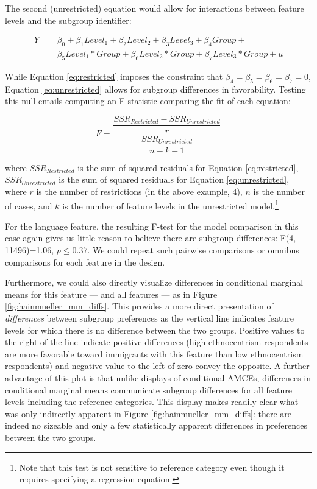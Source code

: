 \documentclass[a4paper,12pt]{article}\usepackage[]{graphicx}\usepackage[]{color}
\begin{document}
\noindent The second (unrestricted) equation would allow for interactions between feature levels and the subgroup identifier:

\begin{equation}\label{eq:unrestricted}
\begin{split}
Y = & \beta_0 + \beta_1 Level_1 + \beta_2 Level_2 + \beta_3 Level_3 + \beta_4 Group + \\
& \beta_5 Level_1 * Group + \beta_6 Level_2 * Group + \beta_7 Level_3 * Group + u
\end{split}
\end{equation}

\noindent While Equation \ref{eq:restricted} imposes the constraint that $\beta_4 = \beta_5 = \beta_6 = \beta_7 = 0$, Equation \ref{eq:unrestricted} allows for subgroup differences in favorability. Testing this null entails computing an F-statistic comparing the fit of each equation:

\begin{equation}
F = \dfrac{\dfrac{SSR_{Restricted} - SSR_{Unrestricted}}{r}}{\dfrac{SSR_{Unrestricted}}{n - k - 1}}
\end{equation}

\noindent where $SSR_{Restricted}$ is the sum of squared residuals for Equation \ref{eq:restricted}, $SSR_{Unrestricted}$ is the sum of squared residuals for Equation \ref{eq:unrestricted}, where $r$ is the number of restrictions (in the above example, 4), $n$ is the number of cases, and $k$ is the number of feature levels in the unrestricted model.\footnote{Note that this test is not sensitive to reference category even though it requires specifying a regression equation.}



For the \citeauthor{HainmuellerHopkinsYamamoto2014} language feature, the resulting F-test for the model comparison in this case again gives us little reason to believe there are subgroup differences: F(4, 11496)=1.06, $p\leq0.37$. We could repeat such pairwise comparisons or omnibus comparisons for each feature in the design.

Furthermore, we could also directly visualize differences in conditional marginal means for this feature --- and all features --- as in Figure \ref{fig:hainmueller_mm_diffs}. This provides a more direct presentation of \textit{differences} between subgroup preferences as the vertical line indicates feature levels for which there is no difference between the two groups. Positive values to the right of the line indicate positive differences (high ethnocentrism respondents are more favorable toward immigrants with this feature than low ethnocentrism respondents) and negative value to the left of zero convey the opposite. A further advantage of this plot is that unlike displays of conditional AMCEs, differences in conditional marginal means communicate subgroup differences for all feature levels including the reference categories. This display makes readily clear what was only indirectly apparent in Figure \ref{fig:hainmueller_mm_diffs}: there are indeed no sizeable and only a few statistically apparent differences in preferences between the two groups.
\end{document}
